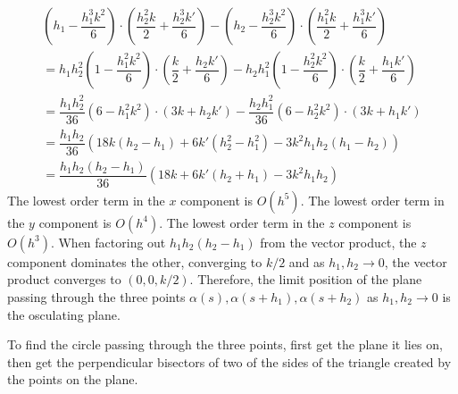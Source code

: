 \documentclass{article}
\begin{document}
	\begin{gather*}
		\left( h_1 - \dfrac{h_1^3 k^2}{6} \right) \cdot \left( \dfrac{h_2^2 k}{2} + \dfrac{h_2^3 k'}{6} \right) - \left( h_2 - \dfrac{h_2^3 k^2}{6} \right) \cdot \left( \dfrac{h_1^2 k}{2} + \dfrac{h_1^3 k'}{6} \right) \\
		= h_1 h_2^2 \left( 1 - \dfrac{h_1^2 k^2}{6} \right) \cdot \left( \dfrac{k}{2} + \dfrac{h_2 k'}{6} \right) - h_2 h_1^2 \left( 1 - \dfrac{h_2^2 k^2}{6} \right) \cdot \left( \dfrac{k}{2} + \dfrac{h_1 k'}{6} \right) \\
		= \dfrac{h_1 h_2^2}{36} \left( 6 - h_1^2 k^2 \right) \cdot \left( 3k + h_2 k' \right) - \dfrac{h_2 h_1^2}{36} \left( 6 - h_2^2 k^2 \right) \cdot \left( 3k + h_1 k' \right) \\
		= \dfrac{h_1 h_2}{36} \left( 18k (h_2 - h_1) + 6k' (h_2^2 - h_1^2) - 3k^2 h_1 h_2 (h_1 - h_2) \right) \\
		= \dfrac{h_1 h_2 (h_2 - h_1)}{36} \left( 18k + 6k' (h_2 + h_1) - 3k^2 h_1 h_2 \right)
	\end{gather*}
	The lowest order term in the $x$ component is $O(h^5)$. The lowest order term in the $y$ component is $O(h^4)$. The lowest order term in the $z$ component is $O(h^3)$. When factoring out $h_1 h_2 (h_2 - h_1)$ from the vector product, the $z$ component dominates the other, converging to $k/2$ and as $h_1, h_2 \to 0$, the vector product converges to $(0, 0, k/2)$. Therefore, the limit position of the plane passing through the three points $\alpha(s), \alpha(s + h_1), \alpha(s + h_2)$ as $h_1, h_2 \to 0$ is the osculating plane.
	
	To find the circle passing through the three points, first get the plane it lies on, then get the perpendicular bisectors of two of the sides of the triangle created by the points on the plane.
\end{document}
